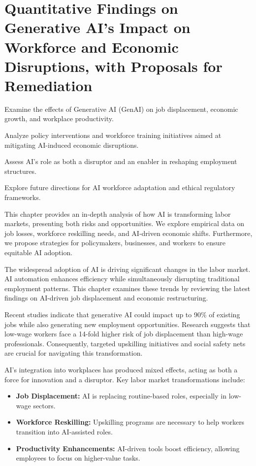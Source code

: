 \documentclass[a4paper,headinclude=on,footinclude=on,12pt,oneside]{scrbook}
\begin{document}
\chapter{Quantitative Findings on Generative AI’s Impact on Workforce and Economic Disruptions, with Proposals for Remediation}

\begin{arrows}
	\item Examine the effects of Generative AI (GenAI) on job displacement, economic growth, and workplace productivity.
	\item Analyze policy interventions and workforce training initiatives aimed at mitigating AI-induced economic disruptions.
	\item Assess AI’s role as both a disruptor and an enabler in reshaping employment structures.
	\item Explore future directions for AI workforce adaptation and ethical regulatory frameworks.
\end{arrows}

This chapter provides an in-depth analysis of how AI is transforming labor markets, presenting both risks and opportunities. We explore empirical data on job losses, workforce reskilling needs, and AI-driven economic shifts. Furthermore, we propose strategies for policymakers, businesses, and workers to ensure equitable AI adoption.


The widespread adoption of AI is driving significant changes in the labor market. AI automation enhances efficiency while simultaneously disrupting traditional employment patterns. This chapter examines these trends by reviewing the latest findings on AI-driven job displacement and economic restructuring.

Recent studies indicate that generative AI could impact up to 90\% of existing jobs while also generating new employment opportunities. Research suggests that low-wage workers face a 14-fold higher risk of job displacement than high-wage professionals. Consequently, targeted upskilling initiatives and social safety nets are crucial for navigating this transformation.


AI’s integration into workplaces has produced mixed effects, acting as both a force for innovation and a disruptor. Key labor market transformations include:
\begin{itemize}
	\item \textbf{Job Displacement:} AI is replacing routine-based roles, especially in low-wage sectors.
	\item \textbf{Workforce Reskilling:} Upskilling programs are necessary to help workers transition into AI-assisted roles.
	\item \textbf{Productivity Enhancements:} AI-driven tools boost efficiency, allowing employees to focus on higher-value tasks.
\end{itemize}
\end{document}
